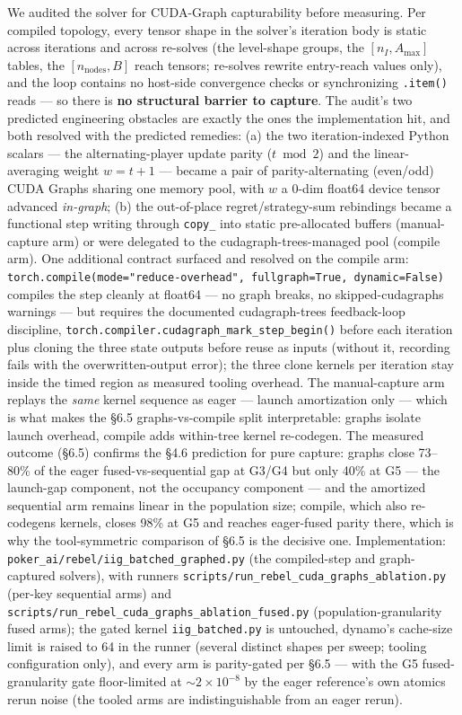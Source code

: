 \documentclass[11pt]{article}
\begin{document}
We audited the solver for CUDA-Graph capturability before measuring. Per
compiled topology, every tensor shape in the solver's iteration body is static across
iterations and across re-solves (the level-shape groups, the $[n_I, A_{\max}]$ tables,
the $[n_{\text{nodes}}, B]$ reach tensors; re-solves rewrite entry-reach values only),
and the loop contains no host-side convergence checks or synchronizing \texttt{.item()}
reads --- so there is \textbf{no structural barrier to capture}. The audit's two
predicted engineering obstacles are exactly the ones the implementation hit, and both
resolved with the predicted remedies: (a) the two iteration-indexed Python scalars ---
the alternating-player update parity ($t \bmod 2$) and the linear-averaging weight $w =
t{+}1$ --- became a pair of parity-alternating (even/odd) CUDA Graphs sharing one
memory pool, with $w$ a 0-dim float64 device tensor advanced \emph{in-graph}; (b) the
out-of-place regret/strategy-sum rebindings became a functional step writing through
\texttt{copy\_} into static pre-allocated buffers (manual-capture arm) or were
delegated to the cudagraph-trees-managed pool (compile arm). One additional contract
surfaced and resolved on the compile arm:
\texttt{torch.compile(mode="reduce-overhead", fullgraph=True, dynamic=False)} compiles
the step cleanly at float64 --- no graph breaks, no skipped-cudagraphs warnings --- but
requires the documented cudagraph-trees feedback-loop discipline,
\texttt{torch.compiler.\allowbreak cudagraph\_mark\_step\_begin()} before each iteration plus
cloning the three state outputs before reuse as inputs (without it, recording fails
with the overwritten-output error); the three clone kernels per iteration stay inside
the timed region as measured tooling overhead. The manual-capture arm replays the
\emph{same} kernel sequence as eager --- launch amortization only --- which is what
makes the \S6.5 graphs-vs-compile split interpretable: graphs isolate launch overhead,
compile adds within-tree kernel re-codegen. The measured outcome (\S6.5) confirms the
\S4.6 prediction for pure capture: graphs close 73--80\% of the eager
fused-vs-sequential gap at G3/G4 but only 40\% at G5 --- the launch-gap component, not
the occupancy component --- and the amortized sequential arm remains linear in the
population size; compile, which also re-codegens kernels, closes 98\% at G5 and reaches
eager-fused parity there, which is why the tool-symmetric comparison of \S6.5 is the
decisive one. Implementation: \texttt{poker\_ai/rebel/iig\_batched\_graphed.py} (the
compiled-step and graph-captured solvers), with runners
\texttt{scripts/run\_rebel\_cuda\_graphs\_ablation.py} (per-key sequential arms) and
\texttt{scripts/run\_rebel\_cuda\_graphs\_ablation\_fused.py} (population-granularity
fused arms); the gated kernel \texttt{iig\_batched.py} is untouched, dynamo's
cache-size limit is raised to 64 in the runner (several distinct shapes per sweep;
tooling configuration only), and every arm is parity-gated per \S6.5 --- with the G5
fused-granularity gate floor-limited at $\sim$$2\times10^{-8}$ by the eager reference's
own atomics rerun noise (the tooled arms are indistinguishable from an eager rerun).
\end{document}
